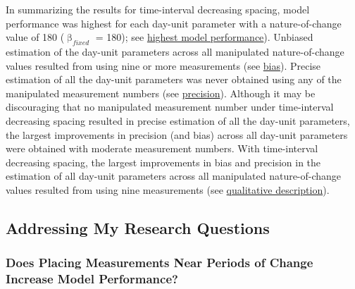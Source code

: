 \documentclass[
12pt, %
twoside,
english]{guelphthesis}
\begin{document}
In summarizing the results for time-interval decreasing spacing, model performance was highest for each day-unit parameter with a nature-of-change value of 180 (\(\upbeta_{fixed}\) = 180); see \protect\hyperlink{nature-change-time-dec-exp1}{highest model performance}). Unbiased estimation of the day-unit parameters across all manipulated nature-of-change values resulted from using nine or more measurements (see \protect\hyperlink{bias-time-dec-exp1}{bias}). Precise estimation of all the day-unit parameters was never obtained using any of the manipulated measurement numbers (see \protect\hyperlink{precision-time-dec-exp1}{precision}). Although it may be discouraging that no manipulated measurement number under time-interval decreasing spacing resulted in precise estimation of all the day-unit parameters, the largest improvements in precision (and bias) across all day-unit parameters were obtained with moderate measurement numbers. With time-interval decreasing spacing, the largest improvements in bias and precision in the estimation of all day-unit parameters across all manipulated nature-of-change values resulted from using nine measurements (see \protect\hyperlink{qualitative-time-inc-exp1}{qualitative description}).

\hypertarget{addressing-my-research-questions}{%
\subsection{Addressing My Research Questions}\label{addressing-my-research-questions}}

\hypertarget{meas-placing}{%
\subsubsection{Does Placing Measurements Near Periods of Change Increase Model Performance?}\label{meas-placing}}
\end{document}
